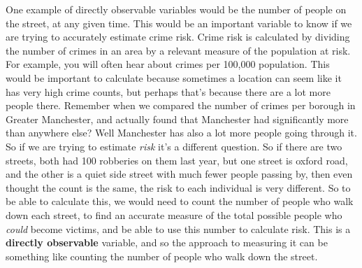 \documentclass[
]{book}
\begin{document}
One example of directly observable variables would be the number of people on the street, at any given time. This would be an important variable to know if we are trying to accurately estimate crime risk. Crime risk is calculated by dividing the number of crimes in an area by a relevant measure of the population at risk. For example, you will often hear about crimes per 100,000 population. This would be important to calculate because sometimes a location can seem like it has very high crime counts, but perhaps that's because there are a lot more people there. Remember when we compared the number of crimes per borough in Greater Manchester, and actually found that Manchester had significantly more than anywhere else? Well Manchester has also a lot more people going through it. So if we are trying to estimate \emph{risk} it's a different question. So if there are two streets, both had 100 robberies on them last year, but one street is oxford road, and the other is a quiet side street with much fewer people passing by, then even thought the count is the same, the risk to each individual is very different. So to be able to calculate this, we would need to count the number of people who walk down each street, to find an accurate measure of the total possible people who \emph{could} become victims, and be able to use this number to calculate risk. This is a \textbf{directly observable} variable, and so the approach to measuring it can be something like counting the number of people who walk down the street.
\end{document}
